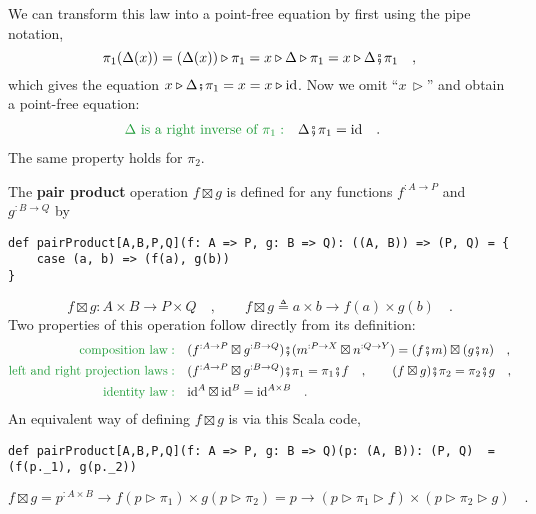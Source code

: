 We can transform this law into a point-free equation by first using
the pipe notation,
\[
\pi_{1}(\Delta(x))=(\Delta(x))\triangleright\pi_{1}=x\triangleright\Delta\triangleright\pi_{1}=x\triangleright\Delta\bef\pi_{1}\quad,
\]
which gives the equation $x\triangleright\Delta\bef\pi_{1}=x=x\triangleright\text{id}$.
Now we omit \textsf{``}$x\,\triangleright$\textsf{''} and obtain a point-free equation:
\begin{align}
{\color{greenunder}\Delta\text{ is a right inverse of }\pi_{1}:}\quad & \Delta\bef\pi_{1}=\text{id}\quad.\label{eq:pair-identity-law-left}
\end{align}
The same property holds for $\pi_{2}$.

The \textbf{pair product}
operation $f\boxtimes g$ is defined for any functions $f^{:A\rightarrow P}$
and $g^{:B\rightarrow Q}$ by
\begin{lstlisting}
def pairProduct[A,B,P,Q](f: A => P, g: B => Q): ((A, B)) => (P, Q) = {
    case (a, b) => (f(a), g(b))
}
\end{lstlisting}
\[
f\boxtimes g:A\times B\rightarrow P\times Q\quad,\quad\quad f\boxtimes g\triangleq a\times b\rightarrow f(a)\times g(b)\quad.
\]
Two properties of this operation follow directly from its definition:
\begin{align}
{\color{greenunder}\text{composition law}:}\quad & (f^{:A\rightarrow P}\boxtimes g^{:B\rightarrow Q})\bef(m^{:P\rightarrow X}\boxtimes n^{:Q\rightarrow Y})=(f\bef m)\boxtimes(g\bef n)\quad,\label{eq:pair-product-composition-law}\\
{\color{greenunder}\text{left and right projection laws}:}\quad & (f^{:A\rightarrow P}\boxtimes g^{:B\rightarrow Q})\bef\pi_{1}=\pi_{1}\bef f\quad,\quad\quad(f\boxtimes g)\bef\pi_{2}=\pi_{2}\bef g\quad,\label{eq:pair-product-projection-laws}\\
{\color{greenunder}\text{identity law}:}\quad & \text{id}^{A}\boxtimes\text{id}^{B}=\text{id}^{A\times B}\quad.\nonumber 
\end{align}
An equivalent way of defining $f\boxtimes g$ is via this Scala code,
\begin{lstlisting}
def pairProduct[A,B,P,Q](f: A => P, g: B => Q)(p: (A, B)): (P, Q)  =  (f(p._1), g(p._2))
\end{lstlisting}
\[
f\boxtimes g=p^{:A\times B}\rightarrow f(p\triangleright\pi_{1})\times g(p\triangleright\pi_{2})=p\rightarrow(p\triangleright\pi_{1}\triangleright f)\times(p\triangleright\pi_{2}\triangleright g)\quad.
\]

